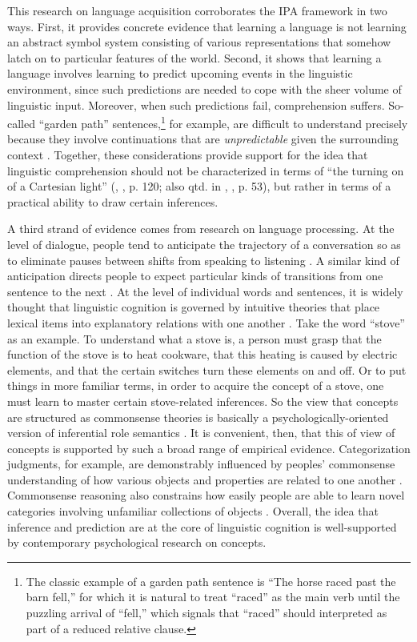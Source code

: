 This research on language acquisition corroborates the IPA framework in two ways. First, it provides concrete evidence that learning a language is not learning an abstract symbol system consisting of various representations that somehow latch on to particular features of the world. Second, it shows that learning a language involves learning to predict upcoming events in the linguistic environment, since such predictions are needed to cope with the sheer volume of linguistic input. Moreover, when such predictions fail, comprehension suffers. So-called ``garden path'' sentences,\footnote{The classic example of a garden path sentence is ``The horse raced past the barn fell,'' for which it is natural to treat ``raced'' as the main verb until the puzzling arrival of ``fell,'' which signals that ``raced'' should interpreted as part of a reduced relative clause.} for example, are difficult to understand precisely because they involve continuations that are \textit{unpredictable} given the surrounding context \citep{Christiansen:2015}. Together, these considerations provide support for the idea that linguistic comprehension should not be characterized in terms of ``the turning on of a Cartesian light'' (\citeauthor{Brandom:1994}, \citeyear{Brandom:1994}, p. 120; also qtd. in \citeauthor{Dennett:2010}, \citeyear{Dennett:2010}, p. 53), but rather in terms of a practical ability to draw certain inferences.

A third strand of evidence comes from research on language processing. At the level of dialogue, people tend to anticipate the trajectory of a conversation so as to eliminate pauses between shifts from speaking to listening \citep{Christiansen:2015,Pickering:2013}. A similar kind of anticipation directs people to expect particular kinds of transitions from one sentence to the next \citep{Rohde:2008}. At the level of individual words and sentences, it is widely thought that linguistic cognition is governed by intuitive theories that place lexical items into explanatory relations with one another \citep{Murphy:1985,MargolisLaurence:1999}. Take the word ``stove'' as an example. To understand what a stove is, a person must grasp that the function of the stove is to heat cookware, that this heating is caused by electric elements, and that the certain switches turn these elements on and off. Or to put things in more familiar terms, in order to acquire the concept of a stove, one must learn to master certain stove-related inferences. So the view that concepts are structured as commonsense theories is basically a psychologically-oriented version of inferential role semantics \citep{Fodor:1998}. It is convenient, then, that this of view of concepts is supported by such a broad range of empirical evidence. Categorization judgments, for example, are demonstrably influenced by peoples' commonsense understanding of how various objects and properties are related to one another \citep{LinMurphy:1997, Murphy:1985}. Commonsense reasoning also constrains how easily people are able to learn novel categories involving unfamiliar collections of objects \citep{Murphy:1985}. Overall, the idea that inference and prediction are at the core of linguistic cognition is well-supported by contemporary psychological research on concepts. 

